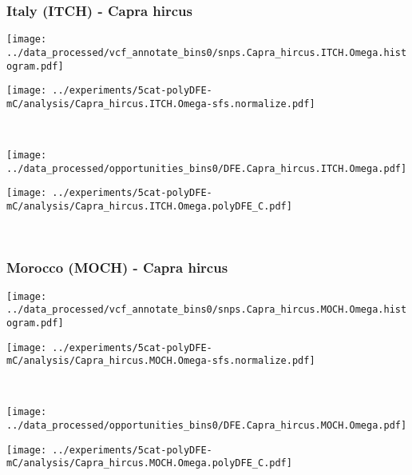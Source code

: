 \subsubsection{Italy (ITCH) - Capra hircus}

\begin{minipage}{0.49\linewidth}
    \texttt{[image: ../data\_processed/vcf\_annotate\_bins0/snps.Capra\_hircus.ITCH.Omega.histogram.pdf]}
\end{minipage}
\begin{minipage}{0.49\linewidth}
    \texttt{[image: ../experiments/5cat-polyDFE-mC/analysis/Capra\_hircus.ITCH.Omega-sfs.normalize.pdf]}
\end{minipage}
\\
\begin{minipage}{0.49\linewidth}
    \texttt{[image: ../data\_processed/opportunities\_bins0/DFE.Capra\_hircus.ITCH.Omega.pdf]}
\end{minipage}
\begin{minipage}{0.49\linewidth}
    \texttt{[image: ../experiments/5cat-polyDFE-mC/analysis/Capra\_hircus.ITCH.Omega.polyDFE\_C.pdf]}
\end{minipage}
\\

\subsubsection{Morocco (MOCH) - Capra hircus}

\begin{minipage}{0.49\linewidth}
    \texttt{[image: ../data\_processed/vcf\_annotate\_bins0/snps.Capra\_hircus.MOCH.Omega.histogram.pdf]}
\end{minipage}
\begin{minipage}{0.49\linewidth}
    \texttt{[image: ../experiments/5cat-polyDFE-mC/analysis/Capra\_hircus.MOCH.Omega-sfs.normalize.pdf]}
\end{minipage}
\\
\begin{minipage}{0.49\linewidth}
    \texttt{[image: ../data\_processed/opportunities\_bins0/DFE.Capra\_hircus.MOCH.Omega.pdf]}
\end{minipage}
\begin{minipage}{0.49\linewidth}
    \texttt{[image: ../experiments/5cat-polyDFE-mC/analysis/Capra\_hircus.MOCH.Omega.polyDFE\_C.pdf]}
\end{minipage}
\\

